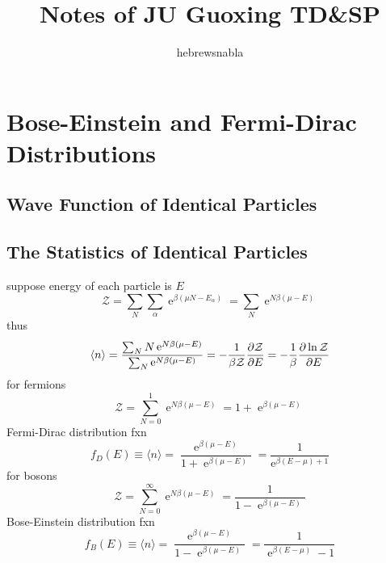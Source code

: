 \documentclass[UTF8]{ctexart} %
\title{Notes of JU Guoxing TD\&SP}
\author{hebrewsnabla}
\DeclareMathOperator{\e}{\mathrm{e}}
\numberwithin{equation}{subsection}
\begin{document}
\maketitle
\setcounter{section}{28}
\section{Bose-Einstein and Fermi-Dirac Distributions}
\subsection{}
\subsection{Wave Function of Identical Particles}
\subsection{The Statistics of Identical Particles}
suppose energy of each particle is $E$
\begin{equation}\label{key}
\mathcal{Z} = \sum_N \sum_\alpha \e^{\beta(\mu N - E_\alpha)} = \sum_N \e^{N\beta(\mu - E)}
\end{equation}
thus
\begin{equation}\label{key}
\langle n\rangle = \dfrac{\sum_N N\e^{N\beta(\mu - E)}}{\sum_N \e^{N\beta(\mu - E)}} = -\dfrac{1}{\beta \mathcal{Z}}\pdv{\mathcal{Z}}{E} = -\dfrac{1}{\beta}\pdv{\ln\mathcal{Z}}{E}
\end{equation}
for fermions
\begin{equation}\label{Z_fer}
\mathcal{Z} = \sum_{N=0}^1 \e^{N\beta(\mu - E)} = 1 + \e^{\beta(\mu - E)}
\end{equation}
Fermi-Dirac distribution fxn
\begin{equation}\label{key}
f_D(E) \equiv \langle n\rangle = \dfrac{\e^{\beta(\mu - E)}}{1 + \e^{\beta(\mu - E)}} = \dfrac{1}{\e^{\beta(E-\mu) + 1}}
\end{equation}
for bosons
\begin{equation}\label{Z_bos}
\mathcal{Z} = \sum_{N=0}^\infty \e^{N\beta(\mu - E)} = \dfrac{1}{1 - \e^{\beta(\mu - E)}}
\end{equation}
Bose-Einstein distribution fxn
\begin{equation}\label{key}
f_B(E) \equiv \langle n\rangle = \dfrac{\e^{\beta(\mu - E)}}{1 - \e^{\beta(\mu - E)}} = \dfrac{1}{\e^{\beta(E-\mu)} - 1}
\end{equation}
\end{document}
